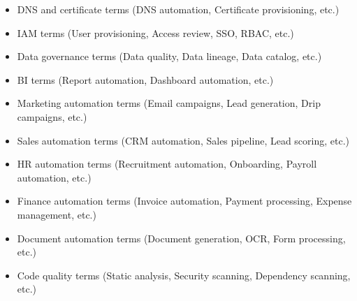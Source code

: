 \documentclass[11pt,a4paper]{article}
\begin{document}
\begin{itemize}
\item DNS and certificate terms (DNS automation, Certificate provisioning, etc.)
\end{itemize}

\begin{itemize}
\item IAM terms (User provisioning, Access review, SSO, RBAC, etc.)
\end{itemize}

\begin{itemize}
\item Data governance terms (Data quality, Data lineage, Data catalog, etc.)
\end{itemize}

\begin{itemize}
\item BI terms (Report automation, Dashboard automation, etc.)
\end{itemize}

\begin{itemize}
\item Marketing automation terms (Email campaigns, Lead generation, Drip campaigns, etc.)
\end{itemize}

\begin{itemize}
\item Sales automation terms (CRM automation, Sales pipeline, Lead scoring, etc.)
\end{itemize}

\begin{itemize}
\item HR automation terms (Recruitment automation, Onboarding, Payroll automation, etc.)
\end{itemize}

\begin{itemize}
\item Finance automation terms (Invoice automation, Payment processing, Expense management, etc.)
\end{itemize}

\begin{itemize}
\item Document automation terms (Document generation, OCR, Form processing, etc.)
\end{itemize}

\begin{itemize}
\item Code quality terms (Static analysis, Security scanning, Dependency scanning, etc.)
\end{itemize}
\end{document}
